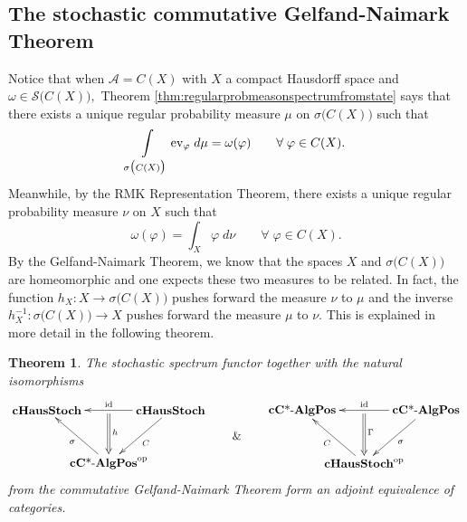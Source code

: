 \documentclass[12pt]{article}
\edef\t{\pgfmathresult}%
\theoremstyle{theorem}
\newtheorem{theorem}[equation]{Theorem}
\theoremstyle{definition}
\numberwithin{equation}{section}
\let\s=\sigma \let\t=\tau \let\u=\upsilon \let\f=\phi \let\c=\chi
\let\w=\omega      \let\G=\Gamma \let\D=\Delta \let\Q=\Theta \let\L=\Lambda
\def\vf{\varphi}
\newcommand{\be}{\begin{equation}}
\newcommand{\ee}{\end{equation}}
\newcommand{\bt}{\begin{theorem}}
\newcommand{\et}{\end{theorem}}
\newcommand{\<}{\langle}
\renewcommand{\>}{\rangle}
\newcommand{\id}{\mathrm{id}}
\newcommand{\aand}{\qquad \& \qquad}
\def\Q{{{\mathbb Q}}}
\newcommand{\cCAlgPos}{\mathbf{cC\text{*-}AlgPos}}
\def\mA{{{\mathcal{A}}}}
\def\mS{{{\mathcal{S}}}}
\newcommand{\op}{\mathrm{op}}
\newcommand{\cHStoch}{\mathbf{cHausStoch}}
\begin{document}
\subsection{The stochastic commutative Gelfand-Naimark Theorem}
\label{sec:stochasticGN}

Notice that when $\mA=C(X)$ with $X$ a compact Hausdorff space and 
$\w\in\mS\big(C(X)\big),$ Theorem 
\ref{thm:regularprobmeasonspectrumfromstate}
says that there exists a unique regular probability measure $\mu$ 
on $\s\big(C(X)\big)$ such that 
\be
\int\displaylimits_{\s\big(C(X)\big)}\mathrm{ev}_{\vf}\;d\mu=\w(\vf)\qquad\forall\;\vf\in C(X). 
\ee
Meanwhile, by the RMK Representation Theorem, there exists a unique regular 
probability measure $\nu$ on $X$ such that 
\be
\w(\vf)=\int_{X}\vf\;d\nu\qquad\forall\;\vf\in C(X).
\ee
By the Gelfand-Naimark Theorem, we know that the spaces
$X$ and $\s\big(C(X)\big)$ are homeomorphic and one expects
these two measures to be related. 
In fact, the function $h_{X}:X\to\s\big(C(X)\big)$ 
pushes forward the measure $\nu$ to $\mu$ and the inverse
$h_{X}^{-1}:\s\big(C(X)\big)\to X$ pushes forward the measure $\mu$
to $\nu.$ 
This is explained in more detail in the following theorem.

\bt
\label{thm:stochasticGN}
The stochastic spectrum functor together with the
natural isomorphisms 
\be
\xy0;/r.25pc/:
(-17.5,7.5)*+{\cHStoch}="3";
(17.5,7.5)*+{\cHStoch}="1";
(0,-7.5)*+{\cCAlgPos^{\op}}="2";
{\ar"1";"2"^{C}};
{\ar"2";"3"^{\s}};
{\ar"1";"3"_{\id}};
{\ar@{=>}(0,6.5);"2"^(0.37){h}};
\endxy
\aand
\xy0;/r.25pc/:
(-17.5,7.5)*+{\cCAlgPos}="3";
(17.5,7.5)*+{\cCAlgPos}="1";
(0,-7.5)*+{\cHStoch^{\op}}="2";
{\ar"1";"2"^{\s}};
{\ar"2";"3"^{C}};
{\ar"1";"3"_{\id}};
{\ar@{=>}(0,6.5);"2"^(0.37){\G}};
\endxy
\ee
from the commutative Gelfand-Naimark Theorem
form an adjoint equivalence of categories. 
\et
\end{document}
